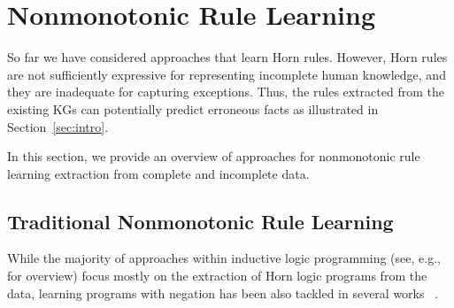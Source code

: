 \section{Nonmonotonic Rule Learning}\label{sec:nmrulelearn}

So far %
we have considered %
approaches that learn Horn rules. However,  Horn rules are not sufficiently expressive for representing incomplete human knowledge, and they are inadequate for capturing
exceptions. Thus, the rules extracted from the existing KGs can potentially %
predict erroneous facts as illustrated in Section~\ref{sec:intro}. %


In this section, we provide an overview of approaches for nonmonotonic rule learning extraction from complete and incomplete data. 




\subsection{Traditional Nonmonotonic Rule Learning}
While the majority of approaches within inductive logic programming (see, e.g., \cite{DBLP:journals/cacm/GulwaniHKMSZ15,DBLP:journals/ml/MuggletonRPBFIS12} for overview) focus mostly on the extraction of Horn logic programs from the data, learning programs with negation has been also tackled in several works %
~\cite{DBLP:conf/ijcai/InoueK97,DBLP:journals/tocl/Sakama05,XHAIL,CorapiRL10,ILASP_system}. %

